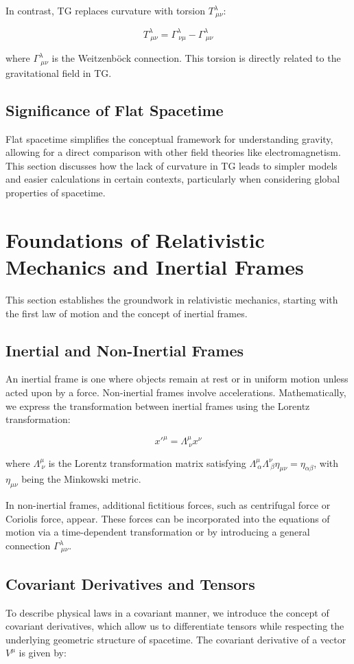 \documentclass[12pt]{article}
\begin{document}
In contrast, TG replaces curvature with torsion \( T^\lambda_{\ \mu\nu} \):

\[
T^\lambda_{\ \mu\nu} = \Gamma^\lambda_{\ \nu\mu} - \Gamma^\lambda_{\ \mu\nu}
\]

where \( \Gamma^\lambda_{\ \mu\nu} \) is the Weitzenböck connection. This torsion is directly related to the gravitational field in TG.

\subsection{Significance of Flat Spacetime}
Flat spacetime simplifies the conceptual framework for understanding gravity, allowing for a direct comparison with other field theories like electromagnetism. This section discusses how the lack of curvature in TG leads to simpler models and easier calculations in certain contexts, particularly when considering global properties of spacetime.

\section{Foundations of Relativistic Mechanics and Inertial Frames}
This section establishes the groundwork in relativistic mechanics, starting with the first law of motion and the concept of inertial frames.

\subsection{Inertial and Non-Inertial Frames}
An inertial frame is one where objects remain at rest or in uniform motion unless acted upon by a force. Non-inertial frames involve accelerations. Mathematically, we express the transformation between inertial frames using the Lorentz transformation:

\[
x'^\mu = \Lambda^\mu_{\ \nu} x^\nu
\]

where \( \Lambda^\mu_{\ \nu} \) is the Lorentz transformation matrix satisfying \( \Lambda^\mu_{\ \alpha} \Lambda^\nu_{\ \beta} \eta_{\mu\nu} = \eta_{\alpha\beta} \), with \( \eta_{\mu\nu} \) being the Minkowski metric.

In non-inertial frames, additional fictitious forces, such as centrifugal force or Coriolis force, appear. These forces can be incorporated into the equations of motion via a time-dependent transformation or by introducing a general connection \( \Gamma^\lambda_{\ \mu\nu} \).

\subsection{Covariant Derivatives and Tensors}
To describe physical laws in a covariant manner, we introduce the concept of covariant derivatives, which allow us to differentiate tensors while respecting the underlying geometric structure of spacetime. The covariant derivative of a vector \( V^\mu \) is given by:
\end{document}
